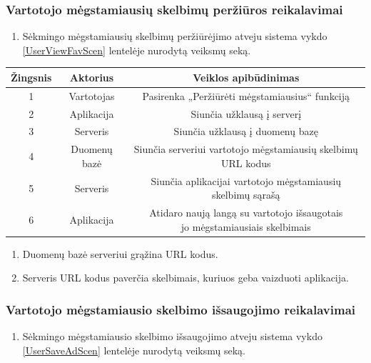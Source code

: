 \documentclass[12pt]{article}
\begin{document}
	\subsubsection{Vartotojo mėgstamiausių skelbimų peržiūros reikalavimai}
	\begin{enumerate}[labelindent=10pt,leftmargin=2.2cm]
		\item Sėkmingo mėgstamiausių skelbimų peržiūrėjimo atveju sistema vykdo \ref{UserViewFavScen} lentelėje nurodytą veiksmų seką.
	\end{enumerate}
		
		\begin{center}
		\begin{tabular}{ | c | c | c | }
			\hline
			Žingsnis & Aktorius     & Veiklos apibūdinimas \\ \hline
			1        & Vartotojas   & Pasirenka „Peržiūrėti mėgstamiausius“ funkciją \\ \hline
			2        & Aplikacija   & Siunčia užklausą į serverį \\ \hline
			3        & Serveris     & Siunčia užklausą į duomenų bazę \\ \hline
			4        & Duomenų bazė & Siunčia serveriui vartotojo mėgstamiausių skelbimų URL kodus \\ \hline
			5        & Serveris     & Siunčia aplikacijai vartotojo mėgstamiausių skelbimų sąrašą \\ \hline
			6        & Aplikacija   & \makecell{Atidaro naują langą su vartotojo išsaugotais \\ jo mėgstamiausiais skelbimais } \\ \hline
		\end{tabular}
		\end{center}
		\bigskip
		
	\begin{enumerate}[resume,labelindent=10pt,leftmargin=2.2cm]
		\item Duomenų bazė serveriui grąžina URL kodus.
		\item Serveris URL kodus paverčia skelbimais, kuriuos geba vaizduoti aplikacija.
	\end{enumerate}
	\pagebreak
	
	\subsubsection{Vartotojo mėgstamiausio skelbimo išsaugojimo reikalavimai}
	\begin{enumerate}[labelindent=10pt,leftmargin=2.2cm]
		\item Sėkmingo mėgstamiausio skelbimo išsaugojimo atveju sistema vykdo \ref{UserSaveAdScen} lentelėje nurodytą veiksmų seką.
	\end{enumerate}
		
\end{document}

